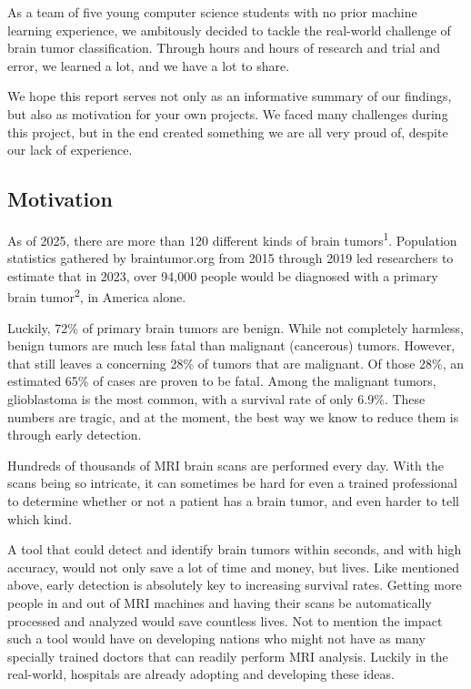 \documentclass[conference]{IEEEtran}
\begin{document}
As a team of five young computer science students with no prior machine learning experience, we ambitously decided to tackle the real-world challenge of brain tumor classification. Through hours and hours of research and trial and error, we learned a lot, and we have a lot to share. 

We hope this report serves not only as an informative summary of our findings, but also as motivation for your own projects. We faced many challenges during this project, but in the end created something we are all very proud of, despite our lack of experience.

\subsection{\large Motivation}

As of 2025, there are more than 120 different kinds of brain tumors\textsuperscript{1}. Population statistics gathered by braintumor.org from 2015 through 2019 led researchers to estimate that in 2023, over 94,000 people would be diagnosed with a primary brain tumor\textsuperscript{2}, in America alone. 

Luckily, 72\% of primary brain tumors are benign. While not completely harmless, benign tumors are much less fatal than malignant (cancerous) tumors. However, that still leaves a concerning 28\% of tumors that are malignant. Of those 28\%, an estimated 65\% of cases are proven to be fatal. Among the malignant tumors, glioblastoma is the most common, with a survival rate of only 6.9\%. These numbers are tragic, and at the moment, the best way we know to reduce them is through early detection.

Hundreds of thousands of MRI brain scans are performed every day. With the scans being so intricate, it can sometimes be hard for even a trained professional to determine whether or not a patient has a brain tumor, and even harder to tell which kind. 

A tool that could detect and identify brain tumors within seconds, and with high accuracy, would not only save a lot of time and money, but lives. Like mentioned above, early detection is absolutely key to increasing survival rates. Getting more people in and out of MRI machines and having their scans be automatically processed and analyzed would save countless lives. Not to mention the impact such a tool would have on developing nations who might not have as many specially trained doctors that can readily perform MRI analysis. Luckily in the real-world, hospitals are already adopting and developing these ideas. 
\end{document}
